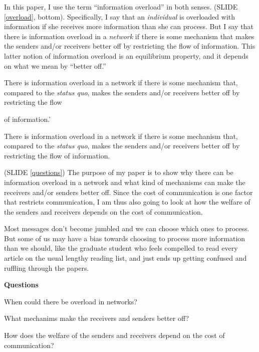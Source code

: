 \documentclass[%
  slidesonly,%
  semlayer%
  ]{seminar}                                  %
\newcommand{\sref}[1]{SLIDE \ref{#1}}
\newcommand{\heading}[1]{\begin{center}\large\bf #1\end{center}}
\begin{document}
  In this paper, I use the term ``information overload'' in both senses.
(\sref{overload}, bottom). Specifically, I say that an {\em individual} is
overloaded with information if she receives more information than she can
process. But I say that there is information overload in a {\em network} if
there is some mechanism that  makes the senders and/or receivers better off by
restricting the flow of  information. This latter notion of information
overload is an equilibrium property, and it depends on what we mean by
``better off.''

\begin{slide*}\label{overload}

\begin{itemize}{
  \item There is information { overload in a network if} there is
some mechanism that, compared to the {\em status quo}, makes the senders
and/or receivers better off by restricting the flow} of information.'

  \item There is information overload in a network if there is some mechanism
that, compared to the {\em status quo}, makes the senders and/or receivers
better off by restricting the flow of information.
\end{itemize}

\end{slide*}

(\sref{questions})
  The purpose of my paper is to show why there can be information overload in
a network and what kind of mechanisms can make the receivers and/or senders
better off. Since the cost of communication is one factor that restricts
communication, I am thus also going to look at how the welfare of the senders
and receivers depends on the cost of communication.

  Most messages don't become jumbled and we can choose which ones to process. 
But some of us may have a bias towards choosing to process more information
than we should, like the graduate student who feels compelled to read every
article on the usual lengthy reading list, and just ends up getting confused
and ruffling through the papers.


\begin{slide}[7.3in,5.5in] \label{questions}
\heading{Questions}

\begin{itemize}
  {\item When could {\blue there be overload} in networks?}
  \item What mechanims make the receivers and senders better off?
  \item How does the welfare {\red of the senders} and receivers depend on the
cost of communication?
\end{itemize}
\end{slide}
\end{document}
